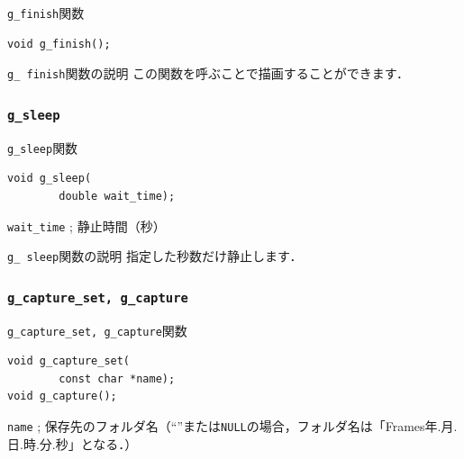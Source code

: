 \documentclass[platex,a4paper,12pt]{jsarticle}%
\begin{document}
\begin{itembox}[l]{\texttt{g\_finish}関数}
\begin{verbatim}
void g_finish();
\end{verbatim}
\end{itembox}

\begin{itembox}[l]{\texttt{g\_ finish}関数の説明}
この関数を呼ぶことで描画することができます．
\end{itembox}


\subsubsection{\texttt{g\_sleep}}

\begin{itembox}[l]{\texttt{g\_sleep}関数}
\begin{verbatim}
void g_sleep(
        double wait_time);
\end{verbatim}
\verb|wait_time| ; 静止時間（秒）
\end{itembox}

\begin{itembox}[l]{\texttt{g\_ sleep}関数の説明}
指定した秒数だけ静止します．
\end{itembox}




\subsubsection{\texttt{g\_capture\_set, g\_capture}}

\begin{itembox}[l]{\texttt{g\_capture\_set, g\_capture}関数}
\begin{verbatim}
void g_capture_set(
        const char *name);
void g_capture();
\end{verbatim}
\verb|name| ; 保存先のフォルダ名（``''または\verb|NULL|の場合，フォルダ名は「Frames年.月.日.時.分.秒」となる．）
\end{itembox}
\end{document}
